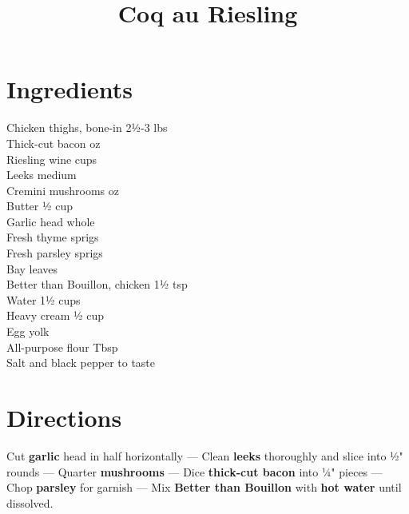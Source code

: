 \documentclass[11pt,letterpaper]{article}
\title{Coq au Riesling}
\author{}
\date{}
\begin{document}
\maketitle
\thispagestyle{empty}

\section*{Ingredients}
\setlength{\columnsep}{20pt}
\begin{multicols}{2}
\noindent
    Chicken thighs, bone-in \dotfill 2½-3 lbs \\
    Thick-cut bacon  oz \\
    Riesling wine  cups \\
    Leeks  medium \\
    Cremini mushrooms  oz \\
    Butter \dotfill ½ cup \\
    Garlic head  whole \\
    \columnbreak
    Fresh thyme  sprigs \\
    Fresh parsley  sprigs \\
    Bay leaves  \\
    Better than Bouillon, chicken \dotfill 1½ tsp \\
    Water \dotfill 1½ cups \\
    Heavy cream \dotfill ½ cup \\
    Egg yolk  \\
    All-purpose flour  Tbsp \\
    Salt and black pepper \dotfill to taste \\
\end{multicols}

\section*{Directions}

\noindent
Cut \textbf{garlic} head in half horizontally ---
Clean \textbf{leeks} thoroughly and slice into ½" rounds ---
Quarter \textbf{mushrooms} ---
Dice \textbf{thick-cut bacon} into ¼" pieces ---
Chop \textbf{parsley} for garnish ---
Mix \textbf{Better than Bouillon} with \textbf{hot water} until dissolved.
\end{document}
